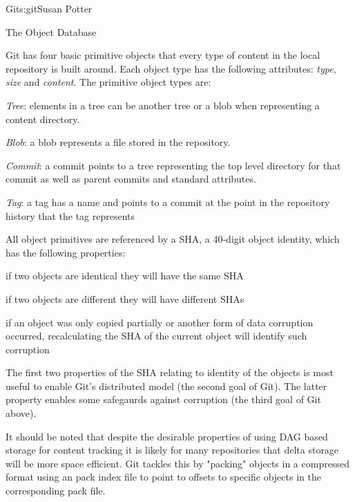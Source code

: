\begin{aosachapter}{Git}{s:git}{Susan Potter}
\begin{aosasect1}{The Object Database}


Git has four basic primitive objects that every type of content in the
local repository is built around. Each object type has the following
attributes: \emph{type}, \emph{size} and \emph{content}. The primitive object
types are:
\begin{aosaitemize}
  \item \emph{Tree}: elements in a tree can be another tree or a blob when
  representing a content directory.
  \item \emph{Blob}: a blob represents a file stored in the repository.
  \item \emph{Commit}: a commit points to a tree representing the top level
  directory for that commit as well as parent commits and standard
  attributes.
  \item \emph{Tag}: a tag has a name and points to a commit at the point in
  the repository history that the tag represents
\end{aosaitemize}

All object primitives are referenced by a SHA, a 40-digit object identity,
which has the following properties:
\begin{aosaitemize}
  \item if two objects are identical they will have the same SHA
  \item if two objects are different they will have different SHAs
  \item if an object was only copied partially or another form of data
        corruption occurred, recalculating the SHA of the current object
        will identify such corruption
\end{aosaitemize}

The first two properties of the SHA relating to identity of the objects is
most useful to enable Git's distributed model (the second goal of Git).
The latter property enables some safegaurds against corruption (the third
goal of Git above).

It should be noted that despite the desirable properties of using DAG based
storage for content tracking it is likely for many repositories that delta
storage will be more space efficient. Git tackles this by "packing" objects
in a compressed format using an pack index file to point to offsets to
specific objects in the corresponding pack file.


\end{aosasect1}
\end{aosachapter}

